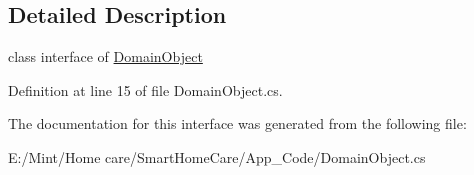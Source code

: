 \subsection{Detailed Description}
class interface of \hyperlink{class_domain_object}{Domain\-Object} 

Definition at line 15 of file Domain\-Object.\-cs.



The documentation for this interface was generated from the following file\-:\begin{DoxyCompactItemize}
\item 
E\-:/\-Mint/\-Home care/\-Smart\-Home\-Care/\-App\-\_\-\-Code/Domain\-Object.\-cs\end{DoxyCompactItemize}
